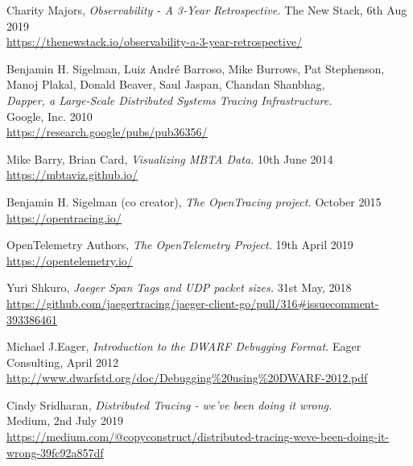 \documentclass[12pt,pdftex,titlepage]{report}
\begin{document}
    \begin{thebibliography}{69}

        Charity Majors, \textit{Observability - A 3-Year Retrospective.} 
        The New Stack, 6th Aug 2019 \\
        \url{https://thenewstack.io/observability-a-3-year-retrospective/}

        Benjamin H. Sigelman, Luiz André Barroso, Mike Burrows, Pat Stephenson, Manoj Plakal, Donald Beaver, Saul Jaspan, Chandan Shanbhag, \\
        \textit{Dapper, a Large-Scale Distributed Systems Tracing Infrastructure.} \\
        Google, Inc. 2010 \\
        \url{https://research.google/pubs/pub36356/}

        Mike Barry, Brian Card, \textit{Visualizing MBTA Data.}
        10th June 2014 \\
        \url{https://mbtaviz.github.io/}

        Benjamin H. Sigelman (co creator), \textit{The OpenTracing project.}
        October 2015 \\
        \url{https://opentracing.io/}

        OpenTelemetry Authors, \textit{The OpenTelemetry Project.} 
        19th April 2019 \\
        \url{https://opentelemetry.io/}

        Yuri Shkuro, \textit{Jaeger Span Tags and UDP packet sizes.}
        31st May, 2018 \\
        \url{https://github.com/jaegertracing/jaeger-client-go/pull/316#issuecomment-393386461}

        Michael J.Eager, \textit{Introduction to the DWARF Debugging Format.}
        Eager Consulting, April 2012 \\
        \url{http://www.dwarfstd.org/doc/Debugging%20using%20DWARF-2012.pdf}

        Cindy Sridharan, \textit{Distributed Tracing - we've been doing it wrong.} \\
        Medium, 2nd July 2019 \\
        \url{https://medium.com/@copyconstruct/distributed-tracing-weve-been-doing-it-wrong-39fc92a857df}


\end{thebibliography}
\end{document}
